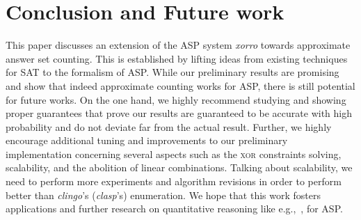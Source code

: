 \documentclass{svproc}
\newcommand{\XOR}{\textsc{xor}} %
\newcommand{\sysfont}{\textit}
\newcommand{\clasp}{\sysfont{clasp}}
\newcommand{\clingo}{\sysfont{clingo}}
\newcommand{\xorro}{\sysfont{xorro}}
\begin{document}


\section{Conclusion and Future work} \label{sec:conclusion}
This paper discusses an extension of the ASP system \xorro{} towards approximate answer set counting.
This is established by lifting ideas from existing techniques for SAT to the formalism of ASP.
While our preliminary results are promising and show that indeed approximate counting works for ASP, there is still potential for future works.
On the one hand, we highly recommend studying and showing proper guarantees that prove our results are guaranteed to be accurate with high probability and do not deviate far from the actual result.
Further, we highly encourage additional tuning and improvements to our preliminary implementation concerning several aspects such as the \XOR{} constraints solving, scalability, and the abolition of linear combinations.
Talking about scalability, we need to perform more experiments and algorithm revisions in order to perform better than \clingo{}'s (\clasp{}'s) enumeration.
We hope that this work fosters applications and further research on quantitative reasoning like e.g.,~\cite{KimmigDRCR11,TsamouraGK20}, for ASP.



\end{document}
